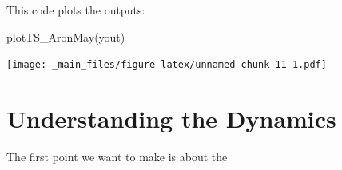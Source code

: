 \documentclass[
]{book}
\newenvironment{Shaded}{\begin{snugshade}}{\end{snugshade}}
\newcommand{\FunctionTok}[1]{\textcolor[rgb]{0.00,0.00,0.00}{#1}}
\newcommand{\NormalTok}[1]{#1}
\begin{document}
This code plots the outputs:

\begin{Shaded}
\begin{Highlighting}[]
\FunctionTok{plotTS\_AronMay}\NormalTok{(yout)}
\end{Highlighting}
\end{Shaded}

\texttt{[image: \_main\_files/figure-latex/unnamed-chunk-11-1.pdf]}

\clearpage

\hypertarget{understanding-the-dynamics}{%
\section{Understanding the Dynamics}\label{understanding-the-dynamics}}

The first point we want to make is about the
\end{document}
